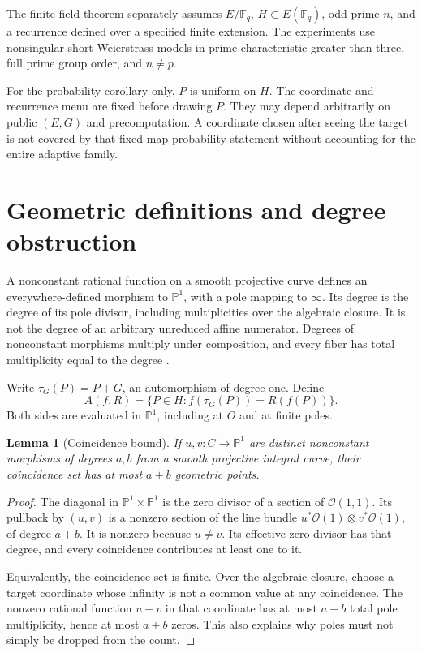 \documentclass[11pt,letterpaper]{article}
\newtheorem{lemma}[theorem]{Lemma}
\theoremstyle{definition}
\theoremstyle{remark}
\newcommand{\F}{\mathbb F}
\newcommand{\PP}{\mathbb P}
\newcommand{\OO}{\mathcal O}
\newcommand{\tauG}{\tau_G}
\begin{document}
The finite-field theorem separately assumes $E/\F_q$, $H\subset E(\F_q)$, odd prime $n$, and a recurrence defined over a specified finite extension. The experiments use nonsingular short Weierstrass models in prime characteristic greater than three, full prime group order, and $n\ne p$.

For the probability corollary only, $P$ is uniform on $H$. The coordinate and recurrence menu are fixed before drawing $P$. They may depend arbitrarily on public $(E,G)$ and precomputation. A coordinate chosen after seeing the target is not covered by that fixed-map probability statement without accounting for the entire adaptive family.

\section{Geometric definitions and degree obstruction}

A nonconstant rational function on a smooth projective curve defines an everywhere-defined morphism to $\PP^1$, with a pole mapping to $\infty$. Its degree is the degree of its pole divisor, including multiplicities over the algebraic closure. It is not the degree of an arbitrary unreduced affine numerator. Degrees of nonconstant morphisms multiply under composition, and every fiber has total multiplicity equal to the degree \cite{milne}.

Write $\tauG(P)=P+G$, an automorphism of degree one. Define
\[
A(f,R)=\{P\in H:f(\tauG(P))=R(f(P))\}.
\]
Both sides are evaluated in $\PP^1$, including at $O$ and at finite poles.

\begin{lemma}[Coincidence bound]\label{lem:coinc}
If $u,v:C\to\PP^1$ are distinct nonconstant morphisms of degrees $a,b$ from a smooth projective integral curve, their coincidence set has at most $a+b$ geometric points.
\end{lemma}
\begin{proof}
The diagonal in $\PP^1\times\PP^1$ is the zero divisor of a section of $\OO(1,1)$. Its pullback by $(u,v)$ is a nonzero section of the line bundle $u^*\OO(1)\otimes v^*\OO(1)$, of degree $a+b$. It is nonzero because $u\ne v$. Its effective zero divisor has that degree, and every coincidence contributes at least one to it.

Equivalently, the coincidence set is finite. Over the algebraic closure, choose a target coordinate whose infinity is not a common value at any coincidence. The nonzero rational function $u-v$ in that coordinate has at most $a+b$ total pole multiplicity, hence at most $a+b$ zeros. This also explains why poles must not simply be dropped from the count.
\end{proof}
\end{document}

